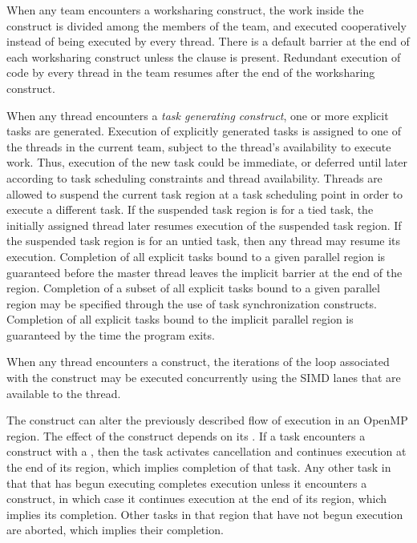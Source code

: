 When any team encounters a worksharing construct, the work inside the construct is 
divided among the members of the team, and executed cooperatively instead of being 
executed by every thread. There is a default barrier at the end of each worksharing 
construct unless the  clause is present. Redundant execution of code by every
thread in the team resumes after the end of the worksharing construct.

When any thread encounters a \emph{task generating construct}, one or more explicit tasks are generated.
Execution of explicitly generated tasks is assigned to one of the threads in the current 
team, subject to the thread's availability to execute work. Thus, execution of the new 
task could be immediate, or deferred until later according to task scheduling constraints 
and thread availability. Threads are allowed to suspend the current task region at a task 
scheduling point in order to execute a different task. If the suspended task region is for
a tied task, the initially assigned thread later resumes execution of the suspended task
region. If the suspended task region is for an untied task, then any thread may resume its
execution. Completion of all explicit tasks bound to a given parallel region is guaranteed
before the master thread leaves the implicit barrier at the end of the region. Completion
of a subset of all explicit tasks bound to a given parallel region may be specified through
the use of task synchronization constructs. Completion of all explicit tasks bound to the
implicit parallel region is guaranteed by the time the program exits.

When any thread encounters a  construct, the iterations of the loop associated with
the construct may be executed concurrently using the SIMD lanes that are available to
the thread.

The  construct can alter the previously described flow of execution in an
OpenMP region. The effect of the  construct depends on its 
. If a task encounters a  
construct with a  
, then the task activates cancellation 
and continues execution at the end of its
 region, which implies completion of that task. 
Any other task in that 
that has begun executing completes execution unless it encounters a 
 construct, in which case it continues execution at the end of its  region,
which implies its completion. Other tasks in that  region that have not
begun execution are aborted, which implies their completion.

